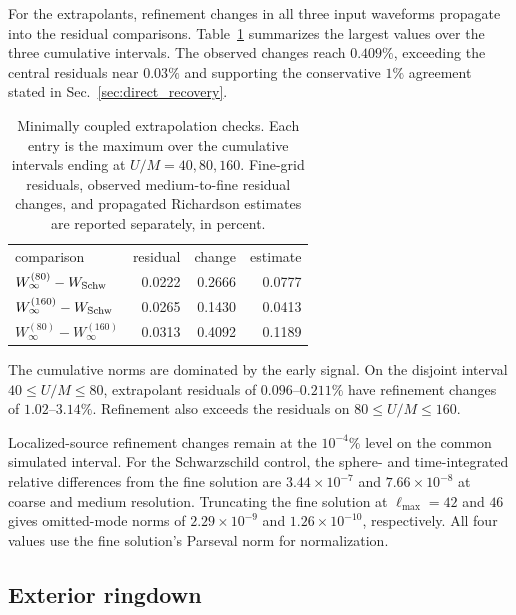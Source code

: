 \documentclass[
 aps,
 prd,
 reprint,
 superscriptaddress,
 nofootinbib,
 longbibliography
]{revtex4-2}
\begin{document}
For the extrapolants, refinement changes in all three input waveforms
propagate into the residual comparisons.  Table~\ref{tab:extrapolants}
summarizes the largest values over the three cumulative intervals.  The
observed changes reach $0.409\%$, exceeding the central residuals near
$0.03\%$ and supporting the conservative $1\%$ agreement stated in
Sec.~\ref{sec:direct_recovery}.

\begin{table}[t]
 \caption{Minimally coupled extrapolation checks.  Each entry is the
 maximum over the cumulative intervals ending at $U/M=40,80,160$.
 Fine-grid residuals, observed medium-to-fine residual changes, and
 propagated Richardson estimates are reported separately, in percent.}
 \label{tab:extrapolants}
 \begin{ruledtabular}
 \begin{tabular}{lrrr}
 comparison & residual & change & estimate\\
 \colrule
 $W_\infty^{(80)}-W_{\rm Schw}$ & 0.0222 & 0.2666 & 0.0777\\
 $W_\infty^{(160)}-W_{\rm Schw}$ & 0.0265 & 0.1430 & 0.0413\\
 $W_\infty^{(80)}-W_\infty^{(160)}$ & 0.0313 & 0.4092 & 0.1189\\
 \end{tabular}
 \end{ruledtabular}
\end{table}

The cumulative norms are dominated by the early signal.  On the disjoint
interval $40\leq U/M\leq80$, extrapolant residuals of $0.096$--$0.211\%$
have refinement changes of $1.02$--$3.14\%$.  Refinement also exceeds the
residuals on $80\leq U/M\leq160$.

Localized-source refinement changes remain at the $10^{-4}\%$ level on
the common simulated interval.  For the Schwarzschild control, the
sphere- and time-integrated relative differences from the fine solution are
$3.44\times10^{-7}$ and $7.66\times10^{-8}$ at coarse and medium resolution.
Truncating the fine solution at $\ell_{\max}=42$ and $46$ gives omitted-mode
norms of $2.29\times10^{-9}$ and $1.26\times10^{-10}$, respectively.
All four values use the fine solution's Parseval norm for normalization.

\subsection{Exterior ringdown}
\label{app:ringdown-verification}
\end{document}
